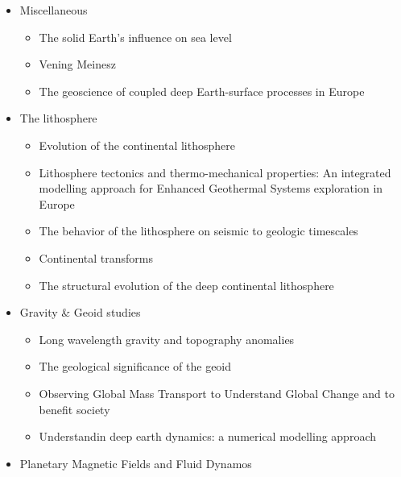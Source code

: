 \begin{itemize}
\item Miscellaneous
   \begin{itemize}
   \item The solid Earth's influence on sea level \cite{conr13}  
   \item Vening Meinesz \cite{vlaa89}
   \item The geoscience of coupled deep Earth-surface processes in Europe \cite{clzb07}
   \end{itemize}

\item The lithosphere
   \begin{itemize}
   \item [\twothousandfive] Evolution of the continental lithosphere \cite{slee05}
   \item [\twothousandten] Lithosphere tectonics and thermo-mechanical properties: An integrated modelling
         approach for Enhanced Geothermal Systems exploration in Europe \cite{clvz10}
   \item [\twothousandthirteen] The behavior of the lithosphere on seismic to geologic timescales \cite{wazh13}
   \item [\twothousandfourteen] Continental transforms \cite{noto14}
   \item [\twothousandseventeen] The structural evolution of the deep continental lithosphere \cite{comm17}
   \end{itemize}

\item Gravity \& Geoid studies
   \begin{itemize}
   \item Long wavelength gravity and topography anomalies \cite{wada81}
   \item The geological significance of the geoid \cite{chas85}
   \item Observing Global Mass Transport to Understand Global Change and to benefit society \cite{pabb15}
   \item Understandin deep earth dynamics: a numerical modelling approach \cite{siag17}
   \end{itemize}

\item Planetary Magnetic Fields and Fluid Dynamos \cite{jone11}



\end{itemize}
